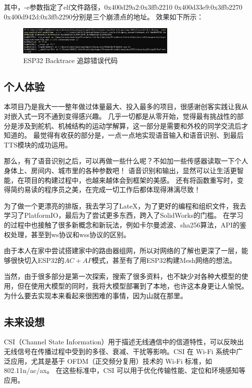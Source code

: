 其中，-e参数指定了elf文件路径，0x400d29a2:0x3ffb2210 0x400d33e9:0x3ffb2270 0x400d942d:0x3ffb2290分别是三个崩溃点的地址。
效果如下所示：

\begin{figure} [H]
    \centering
    \includegraphics[width=0.7\textwidth]{img/ESP32Backtrace.png}
    \caption{ESP32 Backtrace 追踪错误代码}
    \label{fig:ESP32_backtrace}
\end{figure}


\subsection{个人体验}

本项目乃是我大一一整年做过体量最大、投入最多的项目，很感谢创客实践让我从对嵌入式一窍不通到变得感兴趣。
几乎一切都是从零开始，觉得最有挑战性的部分是涉及到舵机、机械结构的运动学解算，这一部分是需要和外校的同学交流后才知道的。
最觉得有收获的部分是，一点一点地实现语音输入和语音识别、到最后TTS模块的成功运用。

那么，有了语音识别之后，可以再做一些什么呢？不如加一些传感器读取一下个人身体上、房间内、城市里的各种参数吧！
语音识别和输出，显然可以让生活更智能，在项目的构建过程中，也越来越体会到框架的美感。
还有将函数重写时，变得简约易读的程序员之美，在完成一切工作后都体现得淋漓尽致！

为了做一个更漂亮的排版，我去学习了LateX，为了更好的编程和组织文件，我去学习了PlatformIO，最后为了尝试更多东西，跨入了SolidWorks的门槛。
在学习的过程中也接触了很多新概念和新玩法，例如卡尔曼滤波、sha256算法，API的鉴权处理，甚至到ws协议和wss协议的区别。

由于本人在家中尝试搭建家中的路由器组网，所以对网络的了解也更深了一层，能够很快切入ESP32的$AC+AP$模式，甚至有了用ESP32构建Mesh网络的想法。

当然，由于很多部分是第一次探索，搜索了很多资料，也不缺少对各种大模型的使用，但在使用大模型的同时，我将大模型部署到了本地，也许这本身更让人愉悦。
为什么要去实现本来看起来很困难的事情，因为山就在那里。

\subsection{未来设想}

CSI（Channel State Information）用于描述无线通信中的信道特性，可以反映出无线信号在传播过程中受到的多径、衰减、干扰等影响。CSI 在 Wi-Fi 系统中广泛应用，尤其是基于 OFDM（正交频分复用）技术的 Wi-Fi 标准，如 802.11n/ac/ax。
在这些标准中，CSI 可以用于优化传输性能、定位和环境感知等应用。


